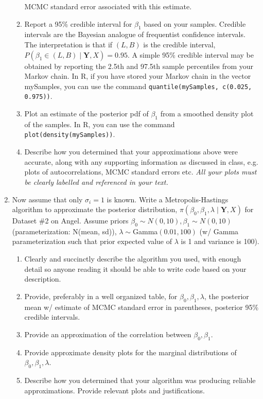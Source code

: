 \documentclass[11pt]{article}
\begin{document}
\begin{enumerate}
\begin{enumerate}
  MCMC standard error associated with this estimate.
\item Report a 95\% credible interval for $\beta_1$ based on your
  samples. Credible intervals are the Bayesian analogue of frequentist
  confidence intervals. The interpretation is that if $(L,B)$ is the
  credible interval, $P(\beta_1 \in (L,B)\mid {\mathbf Y, X})=0.95$. A
  simple 95\% credible interval may be obtained by reporting the 2.5th
  and 97.5th sample percentiles from your Markov chain. In R, if you
  have stored your Markov chain in the vector mySamples, you can use
  the command {\tt quantile(mySamples, c(0.025, 0.975))}.
\item Plot an estimate of the posterior pdf of $\beta_1$ from a
  smoothed density plot of the samples. In R, you can use the command
 {\tt plot(density(mySamples))}.
\item Describe how you determined that your approximations above were 
  accurate, along with any supporting information as discussed in
  class, e.g. plots of autocorrelations, MCMC standard errors
  etc. {\it All your plots must be clearly labelled and referenced in
    your text.}
\end{enumerate}

\item Now assume that only $\sigma_i=1$ is known. Write a
  Metropolis-Hastings algorithm to approximate the posterior
  distribution, $\pi(\beta_0, \beta_1, \lambda\mid {\mathbf Y, X})$
  for Dataset \#2 on Angel. Assume priors $\beta_0\sim N(0,10),
  \beta_1\sim N(0,10)$ (parameterization: N(mean, sd)), $\lambda \sim
  $Gamma$(0.01,100)$ (w/ Gamma parameterization such that prior expected value of $\lambda$ is 1 and variance is 100).
\begin{enumerate}
\item Clearly and succinctly describe the algorithm you used, with
  enough detail so anyone reading it should be able to write code
  based on your description.
\item Provide, preferably in a well organized table, for $\beta_0,
  \beta_1, \lambda$, the posterior mean w/ estimate of MCMC standard
  error in parentheses, posterior 95\% credible intervals.
\item Provide an approximation of the correlation between $\beta_0,
  \beta_1$.
\item Provide approximate density plots for the marginal distributions of $\beta_0, \beta_1, \lambda$. 
\item Describe how you determined that your algorithm was producing
  reliable approximations. Provide relevant plots and justifications.
\end{enumerate}


\end{enumerate}
\end{document}
